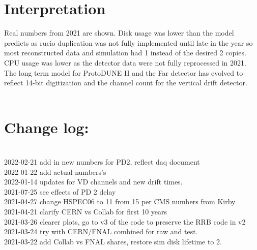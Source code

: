\documentclass[12pt]{article}
\begin{document}
\pagebreak\section*{Interpretation} Real numbers from 2021 are shown. Disk usage was lower than the model predicts as rucio duplication was not fully implemented until late in the year so most  reconstructed data and simulation  had 1 instead of the desired 2 copies. CPU usage was lower as the detector data were not fully reprocessed in 2021. \\The long term model for ProtoDUNE II and the Far detector has evolved to reflect 14-bit digitization and the channel count for the vertical drift detector.\pagebreak \\
\\ {\section*{Change log:}}\\
2022-02-21 add in new numbers for PD2, reflect daq document\\2022-01-22 add actual numbers's\\2022-01-14 updates for VD channels and new drift times.\\2021-07-25 see effects of PD 2 delay\\2021-04-27 change HSPEC06 to 11 from 15 per CMS numbers from Kirby\\2021-04-21 clarify CERN vs Collab for first 10 years\\2021-03-26 clearer plots, go to v3 of the code to preserve the RRB code in v2\\2021-03-24 try with CERN/FNAL combined for raw and test.\\2021-03-22 add Collab vs FNAL shares, restore sim disk lifetime to 2.\\
\end{document}
